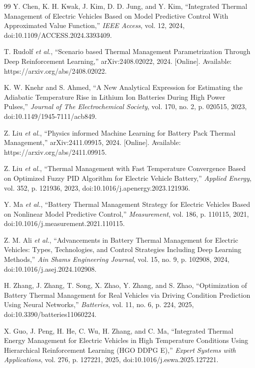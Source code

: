 \documentclass[twocolumn]{article}
\begin{document}
\begin{thebibliography}{99}
Y. Chen, K. H. Kwak, J. Kim, D. D. Jung, and Y. Kim, ``Integrated Thermal Management of Electric Vehicles Based on Model Predictive Control With Approximated Value Function,'' \textit{IEEE Access}, vol. 12, 2024, doi:10.1109/ACCESS.2024.3393409.

T. Rudolf \textit{et al.}, ``Scenario based Thermal Management Parametrization Through Deep Reinforcement Learning,'' arXiv:2408.02022, 2024. [Online]. Available: https://arxiv.org/abs/2408.02022.

K. W. Knehr and S. Ahmed, ``A New Analytical Expression for Estimating the Adiabatic Temperature Rise in Lithium Ion Batteries During High Power Pulses,'' \textit{Journal of The Electrochemical Society}, vol. 170, no. 2, p. 020515, 2023, doi:10.1149/1945-7111/acb849.

Z. Liu \textit{et al.}, ``Physics informed Machine Learning for Battery Pack Thermal Management,'' arXiv:2411.09915, 2024. [Online]. Available: https://arxiv.org/abs/2411.09915.

Z. Liu \textit{et al.}, ``Thermal Management with Fast Temperature Convergence Based on Optimized Fuzzy PID Algorithm for Electric Vehicle Battery,'' \textit{Applied Energy}, vol. 352, p. 121936, 2023, doi:10.1016/j.apenergy.2023.121936.

Y. Ma \textit{et al.}, ``Battery Thermal Management Strategy for Electric Vehicles Based on Nonlinear Model Predictive Control,'' \textit{Measurement}, vol. 186, p. 110115, 2021, doi:10.1016/j.measurement.2021.110115.

Z. M. Ali \textit{et al.}, ``Advancements in Battery Thermal Management for Electric Vehicles: Types, Technologies, and Control Strategies Including Deep Learning Methods,'' \textit{Ain Shams Engineering Journal}, vol. 15, no. 9, p. 102908, 2024, doi:10.1016/j.asej.2024.102908.

H. Zhang, J. Zhang, T. Song, X. Zhao, Y. Zhang, and S. Zhao, ``Optimization of Battery Thermal Management for Real Vehicles via Driving Condition Prediction Using Neural Networks,'' \textit{Batteries}, vol. 11, no. 6, p. 224, 2025, doi:10.3390/batteries11060224.

X. Guo, J. Peng, H. He, C. Wu, H. Zhang, and C. Ma, ``Integrated Thermal Energy Management for Electric Vehicles in High Temperature Conditions Using Hierarchical Reinforcement Learning (HGO DDPG E),'' \textit{Expert Systems with Applications}, vol. 276, p. 127221, 2025, doi:10.1016/j.eswa.2025.127221.


\end{thebibliography}
\end{document}
